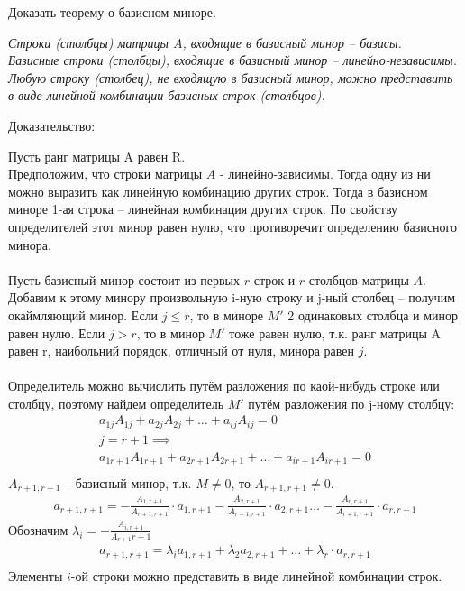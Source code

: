 \begin{question}
  Доказать теорему о базисном миноре.
\end{question} 
\begin{answer}
  \textit{ Строки (столбцы) матрицы $A$, входящие в базисный минор -- базисы. \\
  Базисные строки (столбцы), входящие в базисный минор -- линейно-независимы. \\
Любую строку (столбец), не входящую в базисный минор, можно представить в виде линейной комбинации базисных строк (столбцов).}

  Доказательство: 

  Пусть ранг матрицы A равен R. \\
  Предположим, что строки матрицы $A$ - линейно-зависимы. 
  Тогда одну из ни можно выразить как линейную комбинацию других строк. 
  Тогда в базисном миноре 1-ая строка -- линейная комбинация других строк. 
  По свойству определителей этот минор равен нулю, что противоречит определению базисного минора. \\
  \\
  Пусть базисный минор состоит из первых $r$ строк и $r$ столбцов матрицы $A$. 
  Добавим к этому минору произвольную i-ную строку и j-ный столбец -- получим окаймляющий минор. 
  Если $j \le r$, то в миноре $M'$ 2 одинаковых столбца и минор равен нулю.
  Если $j > r$, то в минор  $M'$ тоже равен нулю, т.к. ранг матрицы A равен r, наибольний порядок, отличный от нуля, минора равен $j$. \\
  \\
  Определитель можно вычислить путём разложения по каой-нибудь строке или столбцу, поэтому найдем определитель $M'$ путём разложения по j-ному столбцу:
   \begin{gather*}
     a_{1j} A_{1j} + a_{2j} A_{2j} + \ldots + a_{ij} A_{ij} = 0 \\
     j = r + 1 \implies \\
     a_{1r+1} A_{1r+1} + a_{2r+1} A_{2r+1} + \ldots + a_{ir+1} A_{ir+1} = 0 \\
  \end{gather*}
  $A_{r+1,r+1}$ -- базисный минор, т.к. $M \neq 0$, то $A_{r+1,r+1} \neq 0$.
  \begin{gather*}
    a_{r+1,r+1} =
    - \frac{A_{1,r+1}}{A_{r+1,r+1}} \cdot  a_{1,r+1}
    - \frac{A_{2,r+1}}{A_{r+1,r+1}} \cdot  a_{2,r+1}
    \ldots
    - \frac{A_{r,r+1}}{A_{r+1,r+1}} \cdot  a_{r,r+1}
  \end{gather*}
  Обозначим $\lambda_i = -\frac{A_{i,r+1}}{A_{r+1}{r+1}}$
  \begin{gather*}
    a_{r+1,r+1} = \lambda_i a_{1,r+1} + \lambda_2 a_{2,r+1} + \ldots + \lambda_r \cdot a_{r,r+1} \\
  \end{gather*}
  Элементы $i$-ой строки можно представить в виде линейной комбинации строк.
\end{answer} 

